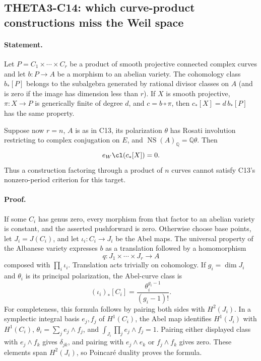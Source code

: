 \documentclass[11pt]{article}
\newcommand{\Q}{\mathbb Q}\newcommand{\C}{\mathbb C}\newcommand{\Z}{\mathbb Z}\newcommand{\R}{\mathbb R}\newcommand{\A}{\mathbb A}\newcommand{\OO}{\mathcal O}
\theoremstyle{definition}\newtheorem{definition}[theorem]{Definition}\newtheorem{remark}[theorem]{Remark}
\begin{document}
\subsection{THETA3-C14: which curve-product constructions miss the Weil space}\label{C14}

\paragraph{Statement.}
Let $P=C_1\times\cdots\times C_r$ be a product of smooth projective
connected complex curves and let $b:P\to A$ be a morphism to an abelian
variety. The cohomology class $b_*[P]$ belongs to the subalgebra
generated by rational divisor classes on $A$ (and is zero if the
image has dimension less than $r$). If $X$ is smooth projective,
$\pi:X\to P$ is generically finite of degree $d$, and $c=b\circ\pi$, then
$c_*[X]=d\,b_*[P]$ has the same property.

Suppose now $r=n$, $A$ is as in C13, its polarization $\theta$ has
Rosati involution restricting to complex conjugation on $E$, and
$\operatorname{NS}(A)_\Q=\Q\theta$. Then
\[
 e_W\cl(c_*[X])=0.
\]
Thus a construction factoring through a product of $n$ curves cannot
satisfy C13's nonzero-period criterion for this target.

\paragraph{Proof.}
If some $C_i$ has genus zero, every morphism from that factor to an
abelian variety is constant, and the asserted pushforward is zero.
Otherwise choose base points, let $J_i=J(C_i)$, and let
$\iota_i:C_i\to J_i$ be the Abel maps. The universal property of
the Albanese variety expresses $b$ as a translation followed by a
homomorphism
\[
 q:J_1\times\cdots\times J_r\longrightarrow A
\]
composed with $\prod_i\iota_i$. Translation acts trivially on
cohomology. If $g_i=\dim J_i$ and $\theta_i$ is its principal
polarization, the Abel-curve class is
\[
 (\iota_i)_*[C_i]=\frac{\theta_i^{g_i-1}}{(g_i-1)!}.
\]
For completeness, this formula follows by pairing both sides with
$H^2(J_i)$. In a symplectic integral basis $e_j,f_j$ of $H^1(C_i)$,
the Abel map identifies $H^1(J_i)$ with $H^1(C_i)$,
$\theta_i=\sum_j e_j\wedge f_j$, and
$\int_{J_i}\prod_j e_j\wedge f_j=1$. Pairing either displayed class
with $e_j\wedge f_k$ gives $\delta_{jk}$, and pairing with
$e_j\wedge e_k$ or $f_j\wedge f_k$ gives zero. These elements span
$H^2(J_i)$, so Poincar\'e duality proves the formula.
\end{document}
